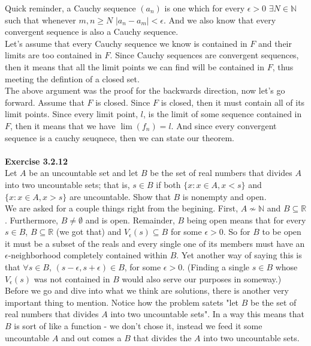 Quick reminder, a Cauchy sequence $(a_n)$ is one which for every $\epsilon >0$
$\exists N\in\mathbb{N}$ such that whenever $m,n \geq N$ $|a_n - a_m| < \epsilon$.
And we also know that every convergent sequence is also a Cauchy sequence.
\\

Let's assume that every Cauchy sequence we know is contained in $F$ and their limits are too contained in $F$.
Since Cauchy sequences are convergent sequences, then it means that all the limit points we can find
will be contained in $F$, thus meeting the defintion of a closed set.
\\

The above argument was the proof for the backwards direction, now let's go forward.
Assume that $F$ is closed.
Since $F$ is closed, then it must contain all of its limit points.
Since every limit point, $l$, is the limit of some sequence contained in $F$, then it means that we have
$\lim (f_n) = l$.
And since every convergent sequence is a cauchy seuqnece, then we can state our theorem.
\\~\\



\textbf{Exercise 3.2.12}
\\

Let $A$ be an uncountable set and let $B$ be the set of real numbers that divides $A$ into two uncountable sets;
that is, $s \in B$ if both $\{ x : x \in A, x < s \}$ and $\{ x : x \in A, x > s\}$ are uncountable.
Show that $B$ is nonempty and open.
\\

We are asked for a couple things right from the begining.
First, $A \not\sim \mathbb{N}$ and $B \subseteq \mathbb{R}$.
Furthermore, $B \neq \emptyset$ and is open.
Remainder, $B$ being open means that for every $s\in B$, $B \subseteq \mathbb{R}$ (we got that)
and $V_\epsilon (s) \subseteq B$ for some $\epsilon >0$.
So for $B$ to be open it must be a subset of the reals and every single one of its members must have
an $\epsilon$-neighborhood completely contained within $B$.
Yet another way of saying this is that $\forall s \in B$, $(s-\epsilon, s+\epsilon) \in B$, for some $\epsilon >0$.
(Finding a single $s\in B$ whose $V_{\epsilon} (s)$ was not contained in $B$ would also serve our purposes in someway.)
\\

Before we go and dive into what we think are solutions, there is another very important thing to mention.
Notice how the problem satets "let $B$ be the set of real numbers that divides $A$ into two uncountable sets".
In a way this means that $B$ is sort of like a function - we don't chose it, instead we feed it some uncountable $A$
and out comes a $B$ that divides the $A$ into two uncountable sets.
\\

